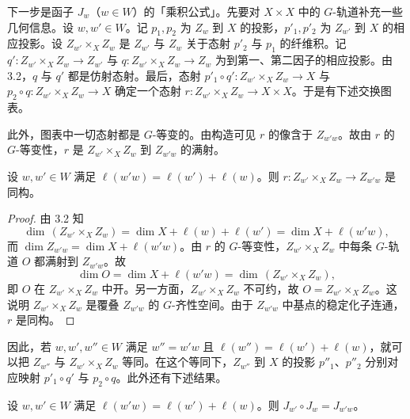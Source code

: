 下一步是函子 $J_w$（$w\in W$）的「乘积公式」。先要对 $X\times X$ 中的 $G$-轨道补充一些几何信息。设 $w,w'\in W$。记 $p_1,p_2$ 为 $Z_w$ 到 $X$ 的投影，$p'_1,p'_2$ 为 $Z_{w'}$ 到 $X$ 的相应投影。设 $Z_{w'}\times_X Z_w$ 是 $Z_{w'}$ 与 $Z_w$ 关于态射 $p'_2$ 与 $p_1$ 的纤维积。记 $q':Z_{w'}\times_X Z_w\to Z_{w'}$ 与 $q:Z_{w'}\times_X Z_w\to Z_w$ 为到第一、第二因子的相应投影。由 3.2，$q$ 与 $q'$ 都是仿射态射。最后，态射 $p'_1\circ q':Z_{w'}\times_X Z_w\to X$ 与 $p_2\circ q:Z_{w'}\times_X Z_w\to X$ 确定一个态射 $r:Z_{w'}\times_X Z_w\to X\times X$。于是有下述交换图表。
\begin{center}
\end{center}
此外，图表中一切态射都是 $G$-等变的。由构造可见 $r$ 的像含于 $Z_{w'w}$。故由 $r$ 的 $G$-等变性，$r$ 是 $Z_{w'}\times_X Z_w$ 到 $Z_{w'w}$ 的满射。

\begin{lemma}\label{lem:03.3.6}
设 $w,w'\in W$ 满足 $\ell(w'w)=\ell(w')+\ell(w)$。则 $r:Z_{w'}\times_X Z_w\to Z_{w'w}$ 是同构。
\end{lemma}

\begin{proof}
由 3.2 知
$$\dim\,(Z_{w'}\times_X Z_w)=\dim X+\ell(w)+\ell(w')=\dim X+\ell(w'w),$$
而 $\dim Z_{w'w}=\dim X+\ell(w'w)$。由 $r$ 的 $G$-等变性，$Z_{w'}\times_X Z_w$ 中每条 $G$-轨道 $O$ 都满射到 $Z_{w'w}$。故
$$\dim O=\dim X+\ell(w'w)=\dim\,(Z_{w'}\times_X Z_w),$$
即 $O$ 在 $Z_{w'}\times_X Z_w$ 中开。另一方面，$Z_{w'}\times_X Z_w$ 不可约，故 $O=Z_{w'}\times_X Z_w$。这说明 $Z_{w'}\times_X Z_w$ 是覆叠 $Z_{w'w}$ 的 $G$-齐性空间。由于 $Z_{w'w}$ 中基点的稳定化子连通，$r$ 是同构。
\end{proof}

因此，若 $w,w',w''\in W$ 满足 $w''=w'w$ 且 $\ell(w'')=\ell(w')+\ell(w)$，就可以把 $Z_{w''}$ 与 $Z_{w'}\times_X Z_w$ 等同。在这个等同下，$Z_{w''}$ 到 $X$ 的投影 $p''_1$、$p''_2$ 分别对应映射 $p'_1\circ q'$ 与 $p_2\circ q$。此外还有下述结果。

\begin{lemma}\label{lem:03.3.7}
设 $w,w'\in W$ 满足 $\ell(w'w)=\ell(w')+\ell(w)$。则 $J_{w'}\circ J_w=J_{w'w}$。
\end{lemma}

